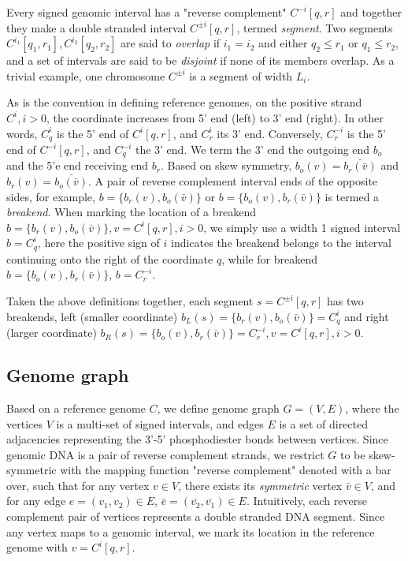 \documentclass[phd,tocprelim]{cornell}
\begin{document}
Every signed genomic interval has a "reverse complement" $C^{-i}[q,r]$ and together they make a double stranded interval $C^{\pm{i}}[q,r]$, termed \textit{segment}. Two segments $C^{i_1}[q_1, r_1], C^{i_2}[q_2, r_2]$ are said to \textit{overlap} if $i_1 = i_2$ and either $q_2 \le r_1$ or $q_1 \le r_2$, and a set of intervals are said to be \textit{disjoint} if none of its members overlap. As a trivial example, one chromosome $C^{\pm{i}}$ is a segment of width $L_i$.

As is the convention in defining reference genomes, on the positive strand $C^i, i>0$, the coordinate increases from 5' end (left) to 3' end (right). In other words, $C^{i}_q$ is the 5' end of $C^{i}[q,r]$, and $C^{i}_r$ its 3' end. Conversely, $C^{-i}_r$ is the 5' end of $C^{-i}[q,r]$, and $C^{-i}_q$ the 3' end. We term the 3' end the outgoing end $b_o$ and the 5'e end receiving end $b_r$. Based on skew symmetry, $b_o (v)= \bar{b_r(\bar{v})}$ and $b_r(v) = \bar{b_o(\bar{v})}$. A pair of reverse complement interval ends of the opposite sides, for example, $b = \{b_r(v), b_o(\bar{v})\}$ or $b = \{b_o(v), b_r(\bar{v})\}$ is termed a \textit{breakend}. When marking the location of a breakend $b = \{b_r(v), b_o(\bar{v})\}, v = C^{i}[q,r], i>0$, we simply use a width 1 signed interval $b = C^{i}_{q}$, here the positive sign of $i$ indicates the breakend belongs to the interval continuing onto the right of the coordinate $q$, while for breakend $b = \{b_o(v), b_r(\bar{v})\}$, $b = C^{-i}_r$.

Taken the above definitions together, each segment $s = C^{\pm{i}}[q,r]$ has two breakends, left (smaller coordinate) $b_L(s) = \{b_r(v), b_o(\bar{v})\} = C^{i}_q$ and right (larger coordinate) $b_R(s) = \{b_o(v), b_r(\bar{v})\} = C^{-i}_{r}, v = C^{i}[q,r], i>0$.

\subsection{Genome graph}
Based on a reference genome $C$, we define genome graph $G = (V, E)$, where the vertices $V$ is a multi-set of signed intervals, and edges $E$ is a set of directed adjacencies representing the 3'-5' phosphodiester bonds between vertices. Since genomic DNA is a pair of reverse complement strands, we restrict $G$ to be skew-symmetric \cite{Goldberg1996-qm} with the mapping function "reverse complement" denoted with a bar over, such that for any vertex $v \in V$, there exists its \textit{symmetric} vertex $\bar{v} \in V$, and for any edge $e = (v_1, v_2) \in E$, $\bar{e} = (\bar{v_2}, \bar{v_1}) \in E$. Intuitively, each reverse complement pair of vertices represents a double stranded DNA segment. Since any vertex maps to a genomic interval, we mark its location in the reference genome with $v = C^{i}[q,r]$.
\end{document}
